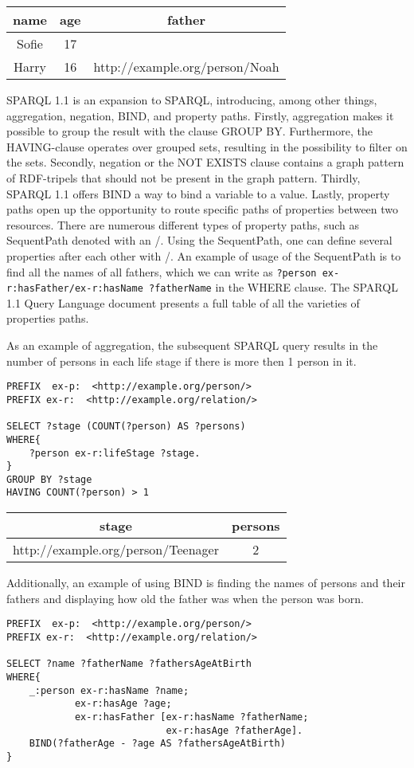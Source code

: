 \para
\begin{tabular}{@{}ccc@{}}
    \toprule
    name & age & father \\ \midrule
    Sofie & 17 & \\ 
    Harry & 16 & http://example.org/person/Noah\\ \bottomrule
\end{tabular}


\para
SPARQL 1.1\cite{SPARQL1.1} is an expansion to SPARQL, introducing, among other things, aggregation, negation, BIND, and property paths. Firstly, aggregation makes it possible to group the result with the clause GROUP BY. Furthermore, the HAVING-clause operates over grouped sets, resulting in the possibility to filter on the sets. Secondly, negation or the NOT EXISTS clause contains a graph pattern of RDF-tripels that should not be present in the graph pattern. Thirdly, SPARQL 1.1 offers BIND a way to bind a variable to a value. Lastly, property paths open up the opportunity to route specific paths of properties between two resources. There are numerous different types of property paths, such as SequentPath denoted with an /. Using the SequentPath, one can define several properties after each other with /. An example of usage of the SequentPath is to find all the names of all fathers, which we can write as \lstinline{?person ex-r:hasFather/ex-r:hasName ?fatherName} in the WHERE clause. The SPARQL 1.1 Query Language document presents a full table of all the varieties of properties paths.

\para
As an example of aggregation, the subsequent SPARQL query results in the number of persons in each life stage if there is more then 1 person in it. 

\begin{lstlisting}[frame=single, language=turtle, frame=none]
PREFIX  ex-p:  <http://example.org/person/> 
PREFIX ex-r:  <http://example.org/relation/> 

SELECT ?stage (COUNT(?person) AS ?persons)
WHERE{
    ?person ex-r:lifeStage ?stage.
}
GROUP BY ?stage
HAVING COUNT(?person) > 1
\end{lstlisting}
    
\para
\begin{tabular}{@{}cc@{}}
    \toprule
    stage & persons  \\ \midrule
    http://example.org/person/Teenager & 2 \\ \bottomrule
\end{tabular}

\para
Additionally, an example of using BIND is finding the names of persons and their fathers and displaying how old the father was when the person was born.
\begin{lstlisting}[frame=single, language=turtle, frame=none]
PREFIX  ex-p:  <http://example.org/person/> 
PREFIX ex-r:  <http://example.org/relation/> 

SELECT ?name ?fatherName ?fathersAgeAtBirth
WHERE{
    _:person ex-r:hasName ?name;
            ex-r:hasAge ?age;
            ex-r:hasFather [ex-r:hasName ?fatherName;
                            ex-r:hasAge ?fatherAge].
    BIND(?fatherAge - ?age AS ?fathersAgeAtBirth)
}
\end{lstlisting}
    
